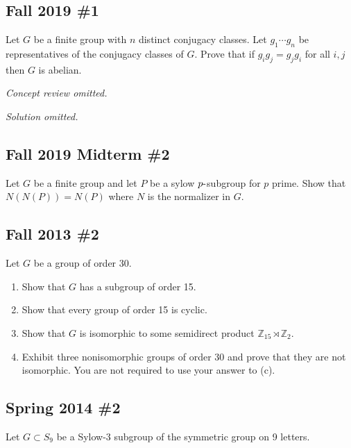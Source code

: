 \hypertarget{fall-2019-1}{%
\subsection{Fall 2019 \#1}\label{fall-2019-1}}

Let \(G\) be a finite group with \(n\) distinct conjugacy classes. Let
\(g_1 \cdots g_n\) be representatives of the conjugacy classes of \(G\).
Prove that if \(g_i g_j = g_j g_i\) for all \(i, j\) then \(G\) is
abelian.

\emph{Concept review omitted.}

\emph{Solution omitted.}

\hypertarget{fall-2019-midterm-2}{%
\subsection{Fall 2019 Midterm \#2}\label{fall-2019-midterm-2}}

Let \(G\) be a finite group and let \(P\) be a sylow
\(p{\hbox{-}}\)subgroup for \(p\) prime. Show that \(N(N(P)) = N(P)\)
where \(N\) is the normalizer in \(G\).

\hypertarget{fall-2013-2}{%
\subsection{Fall 2013 \#2}\label{fall-2013-2}}

Let \(G\) be a group of order 30.

\begin{enumerate}
\def\labelenumi{\alph{enumi}.}
\item
  Show that \(G\) has a subgroup of order 15.
\item
  Show that every group of order 15 is cyclic.
\item
  Show that \(G\) is isomorphic to some semidirect product
  \({\mathbb{Z}}_{15} \rtimes{\mathbb{Z}}_2\).
\item
  Exhibit three nonisomorphic groups of order 30 and prove that they are
  not isomorphic. You are not required to use your answer to (c).
\end{enumerate}

\hypertarget{spring-2014-2}{%
\subsection{Spring 2014 \#2}\label{spring-2014-2}}

Let \(G\subset S_9\) be a Sylow-3 subgroup of the symmetric group on 9
letters.


